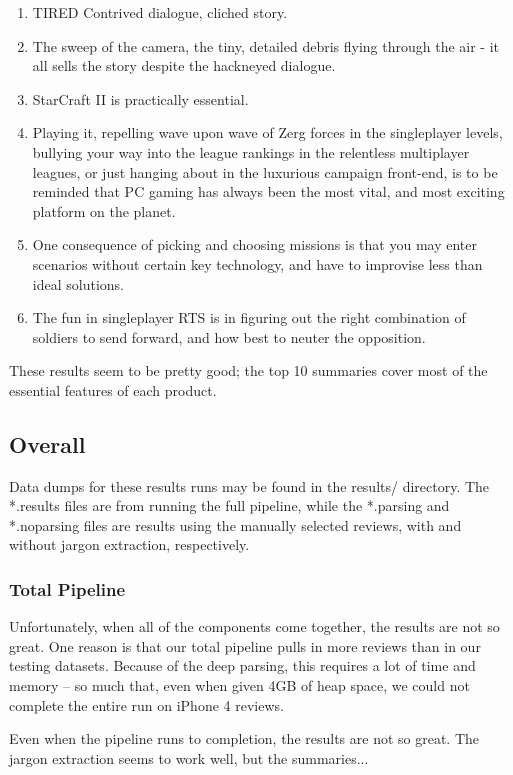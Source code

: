 \documentclass{article}
\begin{document}
\begin{description}
\begin{enumerate}
\item TIRED Contrived dialogue, cliched story.
\item The sweep of the camera, the tiny, detailed debris flying through the air - it all sells the story despite the hackneyed dialogue.
\item StarCraft II is practically essential.
\item Playing it, repelling wave upon wave of Zerg forces in the singleplayer levels, bullying your way into the league rankings in the relentless multiplayer leagues, or just hanging about in the luxurious campaign front-end, is to be reminded that PC gaming has always been the most vital, and most exciting platform on the planet.
\item One consequence of picking and choosing missions is that you may enter scenarios without certain key technology, and have to improvise less than ideal solutions.
\item The fun in singleplayer RTS is in figuring out the right combination of soldiers to send forward, and how best to neuter the opposition.
\end{enumerate}
\end{description}

These results seem to be pretty good; the top 10 summaries cover most of the
essential features of each product.

\subsection{Overall}
Data dumps for these results runs may be found in the results/ directory.
The *.results files are from running the full pipeline, while the
*.parsing and *.noparsing files are results using the manually selected
reviews, with and without jargon extraction, respectively.

\subsubsection{Total Pipeline}
Unfortunately, when all of the components come together, the results are not
so great. One reason is that our total pipeline pulls in more reviews than in
our testing datasets. Because of the deep parsing, this requires a lot of time
and memory -- so much that, even when given 4GB of heap space, we could not
complete the entire run on iPhone 4 reviews.

Even when the pipeline runs to completion, the results are not so great.
The jargon extraction seems to work well, but the summaries...
\end{document}
